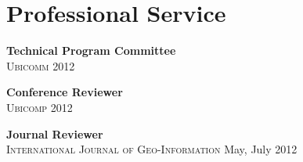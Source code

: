 \section{\sc Professional Service}
{\bf Technical Program Committee}\\
\textsc{Ubicomm} 2012

{\bf Conference Reviewer}\\
\textsc{Ubicomp} 2012

{\bf Journal Reviewer}\\
\textsc{International Journal of Geo-Information} May, July 2012
